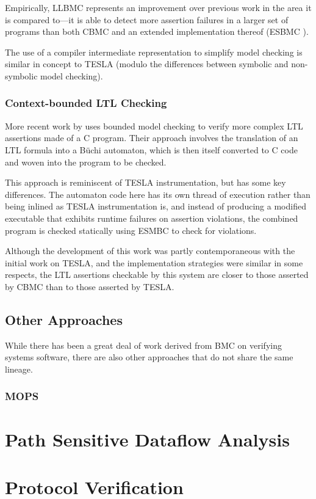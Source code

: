 Empirically, LLBMC represents an improvement over previous work in the
area it is compared to---it is able to detect more assertion failures in
a larger set of programs than both CBMC and an extended implementation
thereof (ESBMC \cite{cordeiro_smt-based_2009}).

The use of a compiler intermediate representation to simplify model
checking is similar in concept to TESLA (modulo the differences between
symbolic and non-symbolic model checking).

\subsubsection{Context-bounded LTL Checking}

More recent work by \textcite{morse_context-bounded_2011,
morse_model_2015-1} uses bounded model checking to verify more complex
LTL assertions made of a C program. Their approach involves the
translation of an LTL formula into a B\"uchi automaton, which is then
itself converted to C code and woven into the program to be checked.

This approach is reminiscent of TESLA instrumentation, but has some key
differences. The automaton code here has its own thread of execution
rather than being inlined as TESLA instrumentation is, and instead of
producing a modified executable that exhibits runtime failures on
assertion violations, the combined program is checked statically using
ESMBC to check for violations.

Although the development of this work was partly contemporaneous with
the initial work on TESLA, and the implementation strategies were
similar in some respects, the LTL assertions checkable by this system
are closer to those asserted by CBMC than to those asserted by TESLA.

\subsection{Other Approaches}

While there has been a great deal of work derived from BMC on verifying
systems software, there are also other approaches that do not share the
same lineage.

\subsubsection{MOPS}

\section{Path Sensitive Dataflow Analysis}

\section{Protocol Verification}
